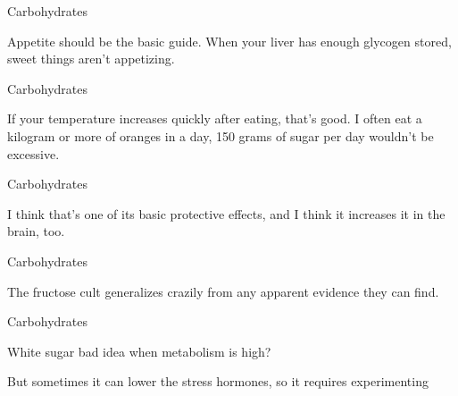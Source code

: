 \documentclass[11pt,oneside,openany,extrafontsizes]{memoir}
\begin{document}
\begin{standalonequote}{Carbohydrates}

    \begin{answer}
        Appetite should be the basic guide. When your liver has enough glycogen stored, sweet things aren't appetizing.
    \end{answer}
\end{standalonequote}

\begin{standalonequote}{Carbohydrates}

    \begin{answer}
        If your temperature increases quickly after eating, that's good. I often eat a kilogram or more of oranges in a day, 150 grams of sugar per day wouldn't be excessive.
    \end{answer}
\end{standalonequote}

\begin{standalonequote}{Carbohydrates}

    \begin{answer}
        I think that's one of its basic protective effects, and I think it increases it in the brain, too.
    \end{answer}
\end{standalonequote}

\begin{standalonequote}{Carbohydrates}

    \begin{answer}
        The fructose cult generalizes crazily from any apparent evidence they can find.
    \end{answer}
\end{standalonequote}

\begin{qaexchange}{Carbohydrates}

    \begin{question}
        White sugar bad idea when metabolism is high?
    \end{question}

    \begin{answer}
        But sometimes it can lower the stress hormones, so it requires experimenting
    \end{answer}
\end{qaexchange}
\end{document}

